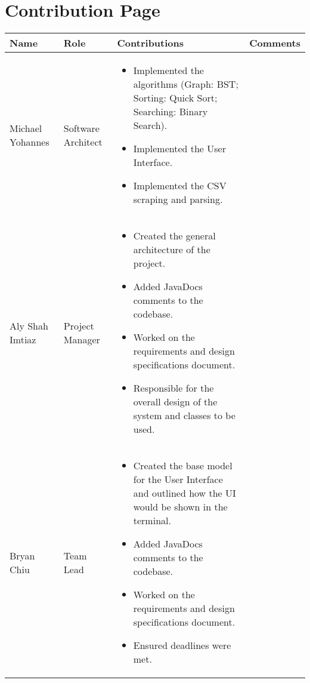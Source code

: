 \let\mypdfximage\pdfximage\def\pdfximage{\immediate\mypdfximage}\documentclass[oneside]{book}
\newcommand{\+}{\discretionary{\mbox{\scriptsize$\hookleftarrow$}}{}{}}
\begin{document}
\chapter{Contribution Page}
\begin{center}
\begin{tabular}{ | l | l | m{5cm} | l | }
\hline
Name & Role & Contributions & Comments\\
\hline
Michael Yohannes & Software Architect & \begin{itemize}[leftmargin=0.2cm]
	\item Implemented the algorithms (Graph: BST; Sorting: Quick Sort; Searching: Binary Search).
	\item Implemented the User Interface.
	\item Implemented the CSV scraping and parsing.
	\end{itemize} &\\
\hline
Aly Shah Imtiaz & Project Manager & \begin{itemize}[leftmargin=0.2cm]
	\item Created the general architecture of the project.
	\item Added JavaDocs comments to the codebase.
	\item Worked on the requirements and design specifications document.
	\item Responsible for the overall design of the system and classes to be used.
	\end{itemize} &\\
\hline
Bryan Chiu & Team Lead & \begin{itemize}[leftmargin=0.2cm]
	\item Created the base model for the User Interface and outlined how the UI would be shown in the terminal. 
	\item Added JavaDocs comments to the codebase.
	\item Worked on the requirements and design specifications document.
	\item Ensured deadlines were met.
	\end{itemize} &\\
\hline
\end{tabular}
\end{center}
\end{document}
